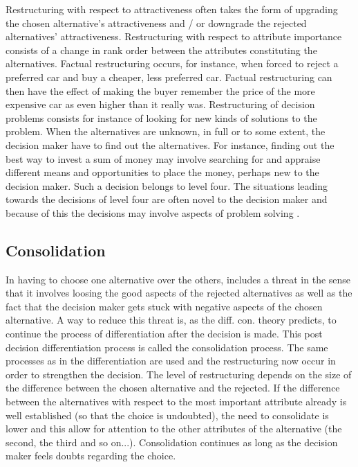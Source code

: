 \documentclass[jou,draftfirst,11pt]{apa6}
\begin{document}
 Restructuring with respect to attractiveness often takes the form of
 upgrading the chosen alternative's attractiveness and / or downgrade
 the rejected alternatives' attractiveness.  Restructuring with
 respect to attribute importance consists of a change in rank order
 between the attributes constituting the alternatives.  Factual
 restructuring occurs, for instance, when forced to reject a preferred
 car and buy a cheaper, less preferred car.  Factual restructuring can
 then have the effect of making the buyer remember the price of the
 more expensive car as even higher than it really was.  Restructuring
 of decision problems consists for instance of looking for new kinds
 of solutions to the problem.  When the alternatives are unknown, in
 full or to some extent, the decision maker have to find out the
 alternatives.  For instance, finding out the best way to invest a sum
 of money may involve searching for and appraise different means and
 opportunities to place the money, perhaps new to the decision maker.
 Such a decision belongs to level four.  The situations leading
 towards the decisions of level four are often novel to the decision
 maker and because of this the decisions may involve aspects of
 problem solving \parencite{svensson92b}.


\subsection{Consolidation}

In having to choose one alternative over the others, includes a threat
in the sense that it involves loosing the good aspects of the rejected
alternatives as well as the fact that the decision maker gets stuck
with negative aspects of the chosen alternative.  A way to reduce this
threat is, as the diff. con. theory predicts, to continue the process
of differentiation after the decision is made.  This post decision
differentiation process is called the consolidation process.  The same
processes as in the differentiation are used and the restructuring now
occur in order to strengthen the decision.  The level of restructuring
depends on the size of the difference between the chosen alternative
and the rejected.  If the difference between the alternatives with
respect to the most important attribute already is well established
(so that the choice is undoubted), the need to consolidate is lower
and this allow for attention to the other attributes of the
alternative (the second, the third and so on...).  Consolidation
continues as long as the decision maker feels doubts regarding the
choice.
\end{document}
